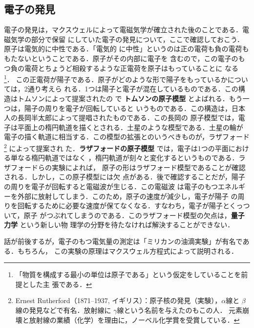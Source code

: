         \subsection{電子の発見}
            電子の発見は，マクスウェルによって電磁気学が確立された後のことである．電磁気学の部分で保留
            にしていた電子の発見について，ここで確認しておこう．原子は電気的に中性である．「電気的
            に中性」というのは正の電荷も負の電荷ももたないということである．原子がその内部に電子を
            含むので，この電子のもつ負の電荷とちょうど相殺するような正電荷を原子はもっていることに
            なる
                \footnote{
                    「物質を構成する最小の単位は原子である」という仮定をしていることを前提とした主
                    張である．
                }．
            この正電荷が陽子である．原子がどのような形で陽子をもっているかについては，2通り考えら
            れる．1つは陽子と電子が混在しているものである．この構造はトムソンによって提案されたの
            で \textbf{トムソンの原子模型} とよばれる．もう一つは，陽子の周りを電子が回転していると
            いうものである．この構造は，日本人の長岡半太郎によって提唱されたものである．この長岡の
            原子模型では，電子は平面上の楕円軌道を描くとされる．土星のような模型である．土星の輪が
            電子の描く軌道に相当する．この模型の拡張とのいうべきものが，ラザフォード
                \footnote{
                    Ernest Rutherford（1871--1937, イギリス）：原子核の発見（実験），$\alpha$線と
                    $\beta$線の発見などで有名．放射線に $\gamma$線という名前を与えたのもこの人．
                    元素崩壊と放射線の業績（化学）を理由に，ノーベル化学賞を受賞している．
                }
            によって提案され
            た．\textbf{ラザフォードの原子模型} では，電子は1つの平面における単なる楕円軌道ではなく
            ，楕円軌道が刻々と変化するというものである．ラザフォードらの実験によれば，
            原子の形はラザフォード模型であることが確認される．しかし，この原子模型には欠
            点がある．後で確認することだが，陽子の周りを電子が回転すると電磁波が生じる．この電磁波
            は電子のもつエネルギーを外部に放射してしまう．このため，原子の速度が減少し，電子が陽子
            の周りを回転するために必要な速度が保てなくなる．すなわち，電子が陽子とくっついて，原子
            がつぶれてしまうのである．このラザフォード模型の欠点は，\textbf{量子力学} という新しい物
            理学の分野を待たなければ解決することができない．

            話が前後するが，電子のもつ電気量の測定は「ミリカンの油滴実験」が有名である．もちろん，
            この実験の原理はマクスウェル方程式によって説明される．

